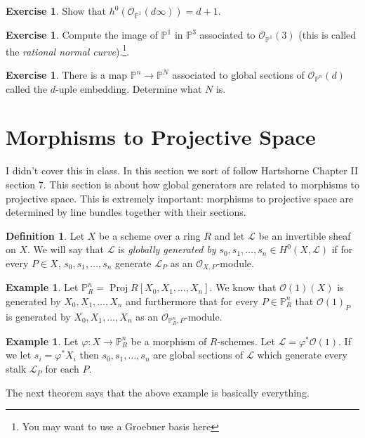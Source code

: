 \documentclass[12pt]{article}
\numberwithin{equation}{section}
\theoremstyle{definition}
\newtheorem{definition}[theorem]{Definition}
\newtheorem{example}[theorem]{Example}
\newtheorem{exercise}[theorem]{Exercise}
\theoremstyle{remark}
\newcommand{\Ocal}{\mathcal{O}}
\newcommand{\PP}{\mathbb{P}}
\newcommand{\Proj}{\operatorname{Proj}}
\newcommand{\Lcal}{\mathcal{L}}
\begin{document}
\begin{exercise}
	Show that $h^0( \Ocal_{\PP^1}(d\infty)) = d+1$.
\end{exercise}

\begin{exercise}
	Compute the image of $\PP^1$ in $\PP^3$ associated to $\Ocal_{\PP^1}(3)$ (this is called the \emph{rational normal curve}).\footnote{You may want to use a Groebner basis here}.
\end{exercise}

\begin{exercise}
	There is a map $\PP^n \to \PP^N$ associated to global sections of $\Ocal_{\PP^n}(d)$ called the $d$-uple embedding. 
	Determine what $N$ is. 
\end{exercise}


\section{Morphisms to Projective Space}\label{sec:maps-to-projective-space}
I didn't cover this in class.
In this section we sort of follow Hartshorne Chapter II section 7.
This section is about how global generators are related to morphisms to projective space. 
This is extremely important: morphisms to projective space are determined by line bundles together with their sections. 
\begin{definition}
	Let $X$ be a scheme over a ring $R$ and let $\Lcal$ be an invertible sheaf on $X$. 
	We will say that $\Lcal$ is \emph{globally generated by} $s_0,s_1,\ldots,s_n \in H^0(X,\Lcal)$ if for every $P \in X$, $s_0,s_1,\ldots,s_n$ generate $\Lcal_P$ as an $\Ocal_{X,P}$-module.
\end{definition}

\begin{example}
	Let $\PP^n_R = \Proj R[X_0,X_1,\ldots,X_n]$. 
	We know that $\Ocal(1)(X)$ is generated by $X_0,X_1,\ldots,X_n$ and furthermore that for every $P\in \PP^n_R$ that $\Ocal(1)_P$ is generated by $X_0,X_1,\ldots, X_n$ as an $\Ocal_{\PP^n_R,P}$-module.
\end{example}

\begin{example}
	Let $\varphi: X \to \PP^n_R$ be a morphism of $R$-schemes. 
	Let $\Lcal = \varphi^*\Ocal(1)$. 
	If we let $s_i = \varphi^*X_i$ then $s_0,s_1,\ldots,s_n$ are global sections of $\Lcal$ which generate every stalk $\Lcal_P$ for each $P$. 
\end{example}
The next theorem says that the above example is basically everything. 
\end{document}
